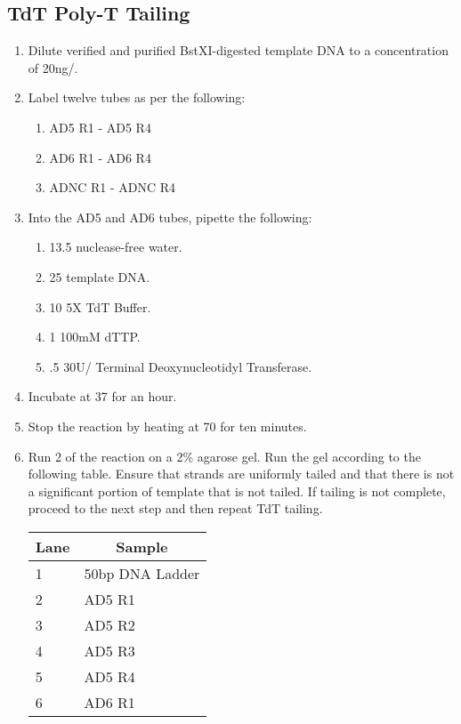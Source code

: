 \documentclass{ssiBio}
\begin{document}
\subsection{TdT Poly-T Tailing}
\begin{enumerate}
  \item{Dilute verified and purified BstXI-digested template DNA to a concentration of 20ng/\uL{}.}
  \item{Label twelve tubes as per the following:}
  \begin{enumerate}
    \item{AD5 R1 - AD5 R4}
    \item{AD6 R1 - AD6 R4}
    \item{ADNC R1 - ADNC R4}
  \end{enumerate}
  \item{Into the AD5 and AD6 tubes, pipette the following:}
  \begin{enumerate}
    \item{13.5\uL{} nuclease-free water.}
    \item{25\uL{} template DNA.}
    \item{10\uL{} 5X TdT Buffer.}
    \item{1\uL{} 100mM dTTP.}
    \item{.5\uL{} 30U/\uL{} Terminal Deoxynucleotidyl Transferase.}
  \end{enumerate}
  \item{Incubate at 37\C{} for an hour.}
  \item{Stop the reaction by heating at 70\C{} for ten minutes.}
  \stopPoint{}
  \item{Run 2\uL{} of the reaction on a 2\% agarose gel. Run the gel according to the following table. Ensure that strands are uniformly tailed and that there is not a significant portion of template that is not tailed. If tailing is not complete, proceed to the next step and then repeat TdT tailing.}
    \begin{table}[ht]
    \centering
    \begin{tabular}{|l|l|}
    \hline
    \multicolumn{1}{|c|}{\textbf{Lane}} & \multicolumn{1}{c|}{\textbf{Sample}} \\ \hline
    1 & 50bp DNA Ladder \\ \hline
    2 & AD5 R1 \\ \hline
    3 & AD5 R2 \\ \hline
    4 & AD5 R3 \\ \hline
    5 & AD5 R4 \\ \hline
    6 & AD6 R1 \\ \hline

\end{tabular}
\end{table}
\end{enumerate}
\end{document}
